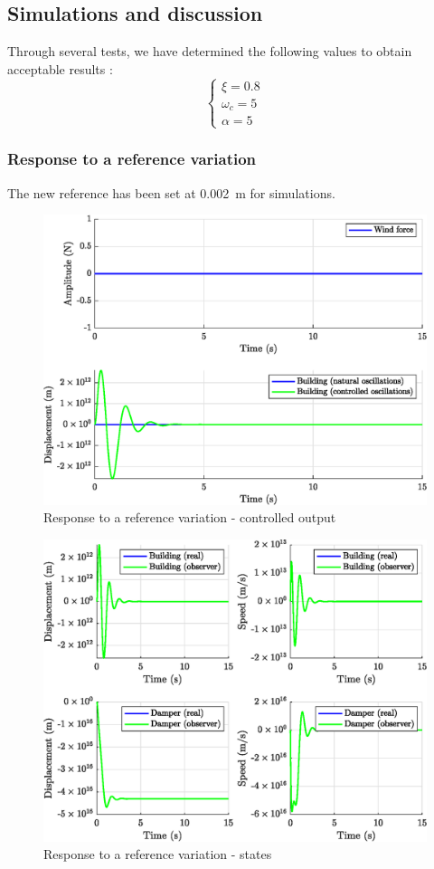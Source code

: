 \subsection{Simulations and discussion}
Through several tests, we have determined the following values to obtain acceptable results :
$$
\begin{cases}
    \xi = 0.8\\
    \omega_c = 5\\
    \alpha = 5
\end{cases}
$$
\subsubsection{Response to a reference variation}
The new reference has been set at \SI{0.002}{\meter} for simulations.
\begin{figure}[H]
    \centering
    \includegraphics[width=\textwidth]{resources/eps/reference-controller.eps}
    \caption{Response to a reference variation - controlled output}
\end{figure}
\begin{figure}[H]
    \centering
    \includegraphics[width=\textwidth]{resources/eps/reference-observer.eps}
    \caption{Response to a reference variation - states}
\end{figure}

